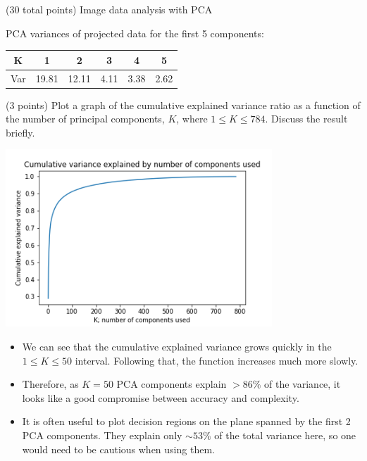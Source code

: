 \documentclass[12pt]{article}
\begin{document}
\begin{question}{(30 total points) Image data analysis with PCA}
\begin{subquestion}
    \begin{answerbox}{15em}
    \begin{center}
    PCA variances of projected data for the first 5 components:
    \begin{tabular}{|c|c|c|c|c|c|}
    \hline 
    K & 1 & 2 & 3 & 4 & 5 \\
    \hline 
    Var & 19.81& 12.11& 4.11& 3.38& 2.62 \\ 
    \hline 
    \end{tabular} 
    \end{center}
    \end{answerbox}
    


   \end{subquestion}

   \begin{subquestion}{(3 points)
       Plot a graph of the cumulative explained variance ratio as a
       function of the number of principal components, $K$, where $1
       \le K \le 784$.
       Discuss the result briefly.
     } \label{Q1.plot.pca.variance}
   

      \begin{answerbox}{30em}
        \begin{center}
			\includegraphics[width=0.75\textwidth]{imgs/1_4.png}
		\end{center}
		\begin{itemize}
		\itemsep -3pt {}
		\item We can see that the cumulative explained variance grows quickly in the $ 1 \leq K  \leq 50 $ interval. Following that, the function increases much more slowly.
		\item Therefore, as $K=50$ PCA components explain $> 86\%$ of the variance, it looks like a good compromise between accuracy and complexity.
		\item It is often useful to plot decision regions on the plane spanned by the first 2 PCA components. They explain only $\sim 53\%$ of the total variance here, so one would need to be cautious when using them.
		\end{itemize}
      \end{answerbox}
  



\end{subquestion}
\end{question}
\end{document}
